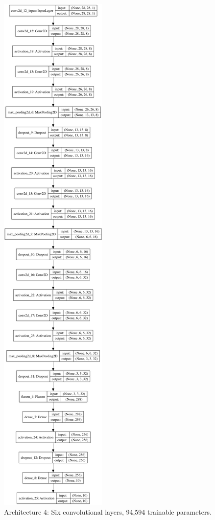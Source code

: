 \documentclass[letterpaper, 10 pt, conference]{ieeeconf}  %
\begin{document}
\begin{figure}[H]
      \centering
      \includegraphics[scale =.2]{model3.png}
		\centering
      \caption{Architecture 4: Six convolutional layers, 94,594 trainable parameters.}
      \label{figurelabel}
 \end{figure}
\end{document}
